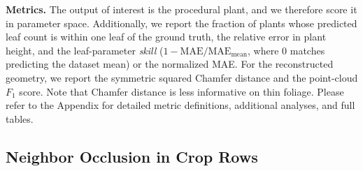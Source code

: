 \documentclass[10pt,twocolumn,letterpaper]{article}
\newcommand{\tabref}[1]{\hyperref[#1]{Table~\ref*{#1}}}
\newcommand{\appendixref}[1]{\hyperref[#1]{Appendix~\ref*{#1}}}
\begin{document}
\noindent\textbf{Metrics.}
The output of interest is the procedural plant, and we therefore score it in parameter space. Additionally, we report the fraction of plants whose predicted leaf count is within one leaf of the ground truth, the relative error in plant height, and the leaf-parameter \emph{skill} ($1 - \mathrm{MAE}/\mathrm{MAE}_{\mathrm{mean}}$, where $0$ matches predicting the dataset mean) or the normalized MAE. For the reconstructed geometry, we report the symmetric squared Chamfer distance and the point-cloud $F_1$ score. Note that Chamfer distance is less informative on thin foliage.
Please refer to the Appendix for detailed metric definitions, additional analyses, and full tables.

\subsection{Neighbor Occlusion in Crop Rows}
\label{sec:regime3}\label{sec:exp-occlusion}

\begin{table}[t]
  \caption{\textbf{The same test plants in isolation and in simulated crop rows} (2{,}250 test plants per species, ten row orientations). Chamfer distance to the target plant is in $10^{-4}\,\mathrm{m}^2$, and MAE is the leaf-parameter MAE on rows. \tabref{tab:rows} gives all inputs with confidence intervals.}
  \label{tab:rows-main}
  \centering\scriptsize
  \setlength{\tabcolsep}{1.2pt}
\renewcommand{\arraystretch}{1.5}
\end{table}
\end{document}
